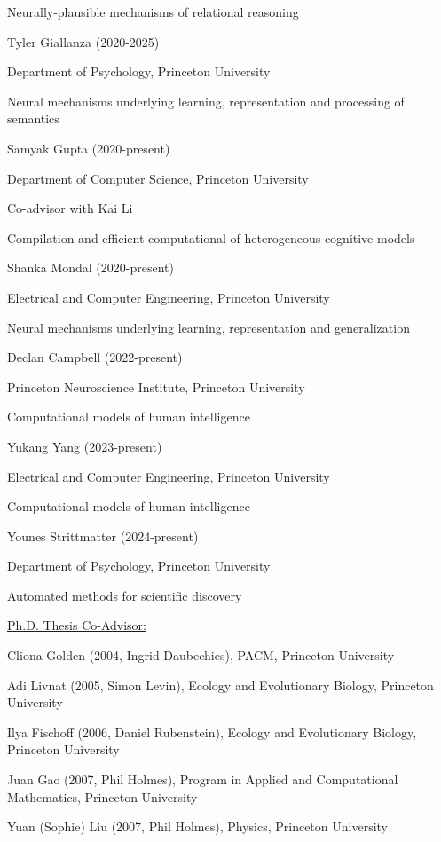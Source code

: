 \documentclass[10 pt]{article}
\begin{document}
Neurally-plausible mechanisms of relational reasoning
    \medskip

Tyler Giallanza (2020-2025)

Department of Psychology, Princeton University

Neural mechanisms underlying learning, representation and processing of semantics
    \medskip

Samyak Gupta (2020-present)

Department of Computer Science, Princeton University

Co-advisor with Kai Li

Compilation and efficient computational of heterogeneous cognitive models
    \medskip

Shanka Mondal (2020-present)

Electrical and Computer Engineering, Princeton University

Neural mechanisms underlying learning, representation and generalization
    \medskip

Declan Campbell (2022-present)

Princeton Neuroscience Institute, Princeton University

Computational models of human intelligence
    \medskip

Yukang Yang (2023-present)

Electrical and Computer Engineering, Princeton University

Computational models of human intelligence
    \medskip

Younes Strittmatter (2024-present)

Department of Psychology, Princeton University

Automated methods for scientific discovery
    \medskip


{\fontsize{12pt}{16 pt}\selectfont \underline{Ph.D. Thesis Co-Advisor:}}
    \smallskip

Cliona Golden (2004, Ingrid Daubechies), PACM, Princeton University
    \smallskip

Adi Livnat (2005, Simon Levin), Ecology and Evolutionary Biology, Princeton University
    \smallskip

Ilya Fischoff (2006, Daniel Rubenstein), Ecology and Evolutionary Biology, Princeton University
    \smallskip

Juan Gao (2007, Phil Holmes), Program in Applied and Computational Mathematics, Princeton University
    \smallskip

Yuan (Sophie) Liu (2007, Phil Holmes), Physics, Princeton University
    \smallskip
\end{document}
